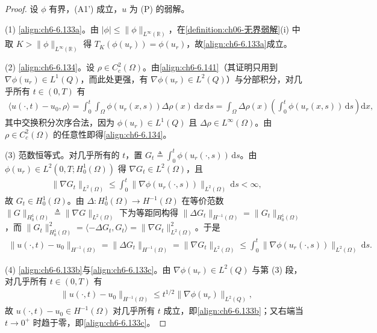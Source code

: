 \documentclass[../../main.tex]{subfiles}%
\begin{document}
\begin{proof}
设 $\phi$ 有界，(A1') 成立，$u$ 为 (P) 的弱解。

(1) \eqref{align:ch6-6.133a}。由 $|\phi|\leqslant\|\phi\|_{L^\infty(\mathbb{R})}$，在\cref{definition:ch06-无界弱解}(i) 中取 $K>\|\phi\|_{L^\infty(\mathbb{R})}$ 得 $T_K(\phi(u_r))=\phi(u_r)$，故\eqref{align:ch6-6.133a}成立。

(2) \eqref{align:ch6-6.134}。设 $\rho\in C^2_c(\Omega)$。由\eqref{align:ch6-6.141}（其证明只用到 $\nabla\phi(u_r)\in L^1(Q)$，而此处更强，有 $\nabla\phi(u_r)\in L^2(Q)$）与分部积分，对几乎所有 $t\in(0,T)$ 有
\begin{align*}
\langle u(\cdot,t)-u_0,\rho\rangle
=\int_0^t\int_\Omega\phi(u_r(x,s))\Delta\rho(x)\,\mathrm{d}x\,\mathrm{d}s
=\int_\Omega\Delta\rho(x)\left(\int_0^t\phi(u_r(x,s))\,\mathrm{d}s\right)\mathrm{d}x ,
\end{align*}
其中交换积分次序合法，因为 $\phi(u_r)\in L^1(Q)$ 且 $\Delta\rho\in L^\infty(\Omega)$。由 $\rho\in C^2_c(\Omega)$ 的任意性即得\eqref{align:ch6-6.134}。

(3) 范数恒等式。对几乎所有的 $t$，置 $G_t\triangleq\int_0^t\phi(u_r(\cdot,s))\,\mathrm{d}s$。由 $\phi(u_r)\in L^2(0,T;H^1_0(\Omega))$ 得 $\nabla G_t\in L^2(\Omega)$，且
\begin{align*}
\|\nabla G_t\|_{L^2(\Omega)}\leqslant\int_0^t\|\nabla\phi(u_r(\cdot,s))\|_{L^2(\Omega)}\,\mathrm{d}s<\infty,
\end{align*}
故 $G_t\in H^1_0(\Omega)$。由 $\Delta:H^1_0(\Omega)\to H^{-1}(\Omega)$ 在等价范数 $\|G\|_{H^1_0(\Omega)}\triangleq\|\nabla G\|_{L^2(\Omega)}$ 下为等距同构得 $\|\Delta G_t\|_{H^{-1}(\Omega)}=\|G_t\|_{H^1_0(\Omega)}$，而 $\|G_t\|^2_{H^1_0(\Omega)}=\langle-\Delta G_t,G_t\rangle=\|\nabla G_t\|^2_{L^2(\Omega)}$。于是
\begin{align*}
\|u(\cdot,t)-u_0\|_{H^{-1}(\Omega)}=\|\Delta G_t\|_{H^{-1}(\Omega)}=\|\nabla G_t\|_{L^2(\Omega)}
\leqslant\int_0^t\|\nabla\phi(u_r(\cdot,s))\|_{L^2(\Omega)}\,\mathrm{d}s .
\end{align*}

(4) \eqref{align:ch6-6.133b}与\eqref{align:ch6-6.133c}。由 $\nabla\phi(u_r)\in L^2(Q)$ 与第 (3) 段，对几乎所有 $t\in(0,T)$ 有
\begin{align*}
\|u(\cdot,t)-u_0\|_{H^{-1}(\Omega)}\leqslant t^{1/2}\|\nabla\phi(u_r)\|_{L^2(Q)},
\end{align*}
故 $u(\cdot,t)-u_0\in H^{-1}(\Omega)$ 对几乎所有 $t$ 成立，即\eqref{align:ch6-6.133b}；又右端当 $t\to0^+$ 时趋于零，即\eqref{align:ch6-6.133c}。


\end{proof}
\end{document}
